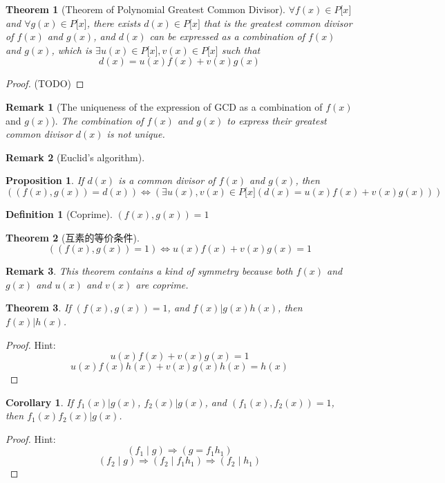 \documentclass[onecolumn]{ctexart}
\newtheorem{definition}{Definition}
\newtheorem{theorem}{Theorem}
\newtheorem{proposition}{Proposition}
\newtheorem{corollary}{Corollary}
\newtheorem{remark}{Remark}
\begin{document}
\begin{theorem}[Theorem of Polynomial Greatest Common Divisor]
  $\forall f(x) \in P\lbrack x \rbrack$ and $\forall g(x) \in P\lbrack x \rbrack$, 
  there exists $d(x) \in P\lbrack x \rbrack$ that is the greatest common divisor 
  of $f(x)$ and $g(x)$, and $d(x)$ can be expressed as a combination of $f(x)$ 
  and $g(x)$, which is $\exists u(x) \in P\lbrack x \rbrack, v(x) \in P\lbrack x 
  \rbrack$ such that
  \[
    d(x) = u(x)f(x) + v(x)g(x)
  \]
\end{theorem}
\begin{proof}
  (TODO)
\end{proof}
\begin{remark}[The uniqueness of the expression of GCD as a combination of $f(x)$ and $g(x)$]
  The combination of $f(x)$ and $g(x)$ to express their greatest common divisor 
  $d(x)$ is not unique.
\end{remark}
\begin{remark}[Euclid's algorithm]
  
\end{remark}

\begin{proposition}
  If $d(x)$ is a common divisor of $f(x)$ and $g(x)$, then
  \[
    ((f(x), g(x)) = d(x)) \Leftrightarrow (\exists u(x), v(x) \in P\lbrack x \rbrack (d(x) = u(x)f(x) + v(x)g(x)))
  \]
\end{proposition}

\begin{definition}[Coprime]
  $(f(x), g(x)) = 1$
\end{definition}

\begin{theorem}[互素的等价条件]
  \[
    ((f(x), g(x)) = 1) \Leftrightarrow u(x)f(x) + v(x)g(x) = 1
  \]
\end{theorem}
\begin{remark}
  This theorem contains a kind of symmetry because both $f(x)$ and $g(x)$ and $u(x)$ and $v(x)$ are coprime.
\end{remark}

\begin{theorem}
  If $(f(x), g(x)) = 1$, and $f(x) | g(x)h(x)$, then $f(x) | h(x)$.
\end{theorem}
\begin{proof}
  Hint:
  \[
    u(x)f(x) + v(x)g(x) = 1
  \]
  \[
    u(x)f(x)h(x) + v(x)g(x)h(x) = h(x)
  \]
\end{proof}
\begin{corollary}
  If $f_1(x) | g(x)$, $f_2(x) | g(x)$, and $(f_1(x), f_2(x)) = 1$, then $f_1(x)f_2(x) | g(x)$.
\end{corollary}
\begin{proof}
  Hint:
  \[
    (f_1 \mid g) \Rightarrow (g = f_1 h_1)
  \]
  \[
    (f_2 \mid g) \Rightarrow (f_2 \mid f_1 h_1) \Rightarrow (f_2 \mid h_1)
  \]
\end{proof}
\end{document}
